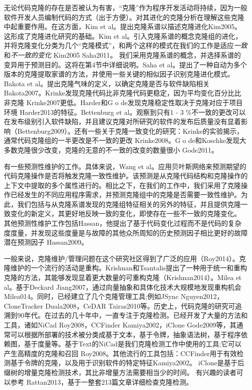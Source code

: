 {无论代码克隆的存在是否被认为有害，“克隆”作为程序开发活动将持续，因为一般软件开发人员编制代码的方式（出于方便）。对其进化的克隆分析在理解这些克隆中起重要作用。在这方面，Kim et al。提出克隆系谱以描述克隆进化\cite{}{Kim2005}。这形成了克隆进化研究的基础。Kim et al。引入克隆系谱的概念克隆组的进化，并将克隆变化分类为几个“克隆模式”，和两个这样的模式在我们的工作是适应{\em 一致}和{\em 不一致的变化} \cite{} {Kim2005} \cite{} {Saha2011}。
我们采用克隆系谱的概念，并选择系谱的变异用于预测目的。这将在第4节中详细说明。Saha et al。提出了一种自动为多个版本的克隆提取家谱的方法，并使用一些关键的相似因子识别克隆进化模式。Bakota et al。提出克隆气味的定义，以确定克隆是否与软件缺陷相关\cite{} {Bakota2007}。Krinke发现克隆代码比非克隆代码更稳定，因为平均变化百分比比非克隆\cite{} {Krinke2007}更低。Harder和G o de发现克隆稳定性取决于克隆对应于项目环境\cite{} {Harder2013}的特征。Bettenburg et al。观察到只有1 - 3 \%不一致的更改可以在发布级别引入软件缺陷，并且建议克隆对所研究的软件的发布后质量没有显着影响\cite{}（Bettenburg2009）。还有一些关于克隆一致变化的研究：Krinke的实验揭示，通常代码克隆组的一半更改是不一致的更改\cite{} {Krinke2008}。G o de和Koschke发现大多数克隆很少改变，克隆的无意的不一致的改变的数量很小\cite{} {Gode2011}。

有一些预测性维护的工作。具体来说，Wang et al。应用贝叶斯网络来预测期望的代码克隆操作是否将触发克隆一致性维护。该预测是从克隆代码结构和克隆操作的上下文中提取的多个属性进行的。相比之下，在我们的工作中，我们采用了克隆操作已经发生的不同应用程序需求，并预测克隆组中的克隆是否需要一致性维护。为此，我们包括与从克隆系谱发现的克隆组特征相关的另外的特征，并且提供克隆一致变化的新定义，其更好地反映一致的变化，即使存在一些不一致的克隆变化。
其他预测性维护工作包括Hassan，他提出了基于代码变化过程而不是代码的复杂度度量，并发现这些度量是与故障的其他众所周知的历史预测因子相比更好的故障潜在预测因子\cite{}{ Hassan2009}。

一般来说，克隆维护/管理问题在这个研究社区得到了广泛的应用\cite{}（Roy2014）。克隆维护的一个流行的活动是重构。Krishnan和Tsantalis提出了一种用于统一和重构克隆的方法，其能够发现显着更大数量的可重构克隆\cite{}（Krishnan2014）。Milea et al。基于Deckard \cite{} {Jiang2007}，通过向量抽象和具体化技术大规模地发现重构机会\cite{} {Milea014}。同时，已经建立了几个克隆管理工具;例如JSync \cite{} {Nguyen2012}，CloneTracker \cite{} {Duala2008}，CeDAR \cite{} {Tairas2010}等。历史上，代码克隆的研究可追溯到90年代。在过去的几十年中，一直专注于克隆检测。已经开发了大量的方法和工具，诸如NiCad \cite{} {Roy2008}，CCFinder \cite{} {Kamiya2002}，iClone \cite{} {Gode2009}等，其通常可以根据所部署的技术被分类成基于文本，基于令牌，抽象语法树，基于程序依赖图，基于度量等。基于Text的NiCad是我们克隆检测工作中使用的工具;它可以产生高精度的克隆和召回\cite{} {Roy2008}。其他流行的工具包括：CCFinder用于有效检测基于令牌的克隆，以及用于识别软件的特定特征\cite{}{Kamiya2002}。
iClone是基于后缀树的增量克隆检测技术，其比非增量方法需要相当少的时间。
有兴趣的读者可以参考\cite{} {Rattan2013}，基于一整套213篇文章详细检查克隆检测。

}

